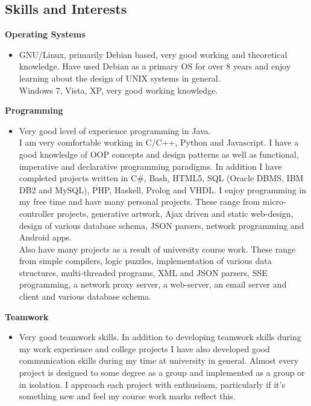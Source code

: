 \documentclass{res}
\begin{document}
\begin{resume}
\section{Skills and Interests} 
\vspace{0.1in}
 {\bf Operating Systems}
    \begin{itemize} %
      \item[] GNU/Linux, primarily Debian based, very good working and theoretical knowledge. Have used Debian as a primary OS for over 8 years and enjoy learning about the design of UNIX systems in general.\\
        Windows 7, Vista, XP, very good working knowledge.
      \end{itemize}
{\bf Programming} 
       \begin{itemize}
        \item[] Very good level of experience programming in Java.\\
        I am very comfortable working in C/C++, Python and Javascript.
        I have a good knowledge of OOP concepts and design patterns as well as functional, imperative and declarative programming paradigms.  
        In addition I have completed projects written in C\#, Bash, HTML5, SQL (Oracle DBMS, IBM DB2 and MySQL), PHP, Haskell, Prolog and VHDL. I enjoy programming in my free time and have many personal projects. These range from micro-controller projects, generative artwork, Ajax driven and static web-design, design of various database schema, JSON parsers, network programming and Android apps.\\
        Also have many projects as a result of university course work. These range from simple compilers, logic puzzles, implementation of various data structures, multi-threaded programs, XML and JSON parsers, SSE programming, a network proxy server, a web-server, an email server and client and various database schema.
    \end{itemize}

    {\bf  Teamwork} 
        \begin{itemize}
        \item[]  Very good teamwork skills. In addition to developing teamwork skills during my work experience and college projects I have also developed good communication skills during my time at university in general. Almost every project is designed to some degree as a group and implemented as a group or in isolation. I approach each project with enthusiasm, particularly if it's something new and feel my course work marks reflect this.
       \end{itemize} 


\end{resume}
\end{document}

